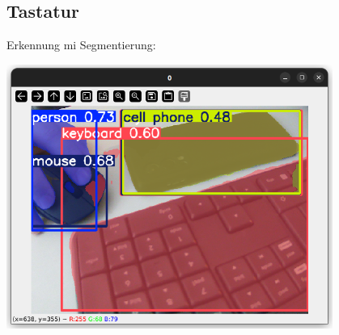 \documentclass{article}
\begin{document}
\subsection{Tastatur}
Erkennung mi Segmentierung: 

\begin{center}
    \includegraphics[width=0.8\textwidth]{Bilder/Yolo_Segmentierungsbeispiel.png}
\end{center}
\end{document}
